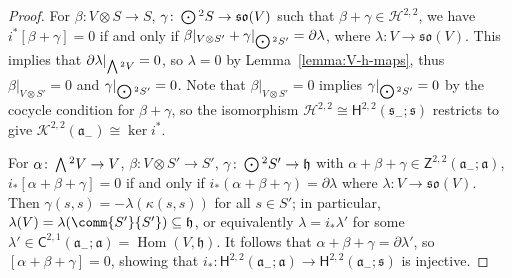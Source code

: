 \documentclass[10pt,a4paper]{amsart}
\numberwithin{equation}{section}
\newcommand{\fa}{\mathfrak{a}}
\newcommand{\fh}{\mathfrak{h}}
\newcommand{\fs}{\mathfrak{s}}
\newcommand{\fso}{\mathfrak{so}}
\newcommand{\cH}{\mathcal{H}}
\newcommand{\cK}{\mathcal{K}}
\newcommand{\ssC}{\mathsf{C}}
\newcommand{\ssH}{\mathsf{H}}
\newcommand{\ssZ}{\mathsf{Z}}
\newcommand{\Wedge}{\mathchoice{{\textstyle\bigwedge}}{\bigwedge}{\bigwedge}{\bigwedge}}	%
\newcommand{\Odot}{\mathchoice{{\textstyle\bigodot}}{\bigodot}{\bigodot}{\bigodot}}
\newcommand{\1}{\mathbbm{1}}
\DeclareMathOperator{\Hom}{Hom}
\begin{document}
\begin{proof}
	For $\beta\colon V\otimes S\to S$, $\gamma\colon \Odot^2S\to\fso(V)$ such that $\beta+\gamma\in\cH^{2,2}$, we have $i^*[\beta+\gamma]=0$ if and only if $\beta|_{V\otimes S'}+\gamma|_{\Odot^2S'}=\partial\lambda$, where $\lambda\colon V\to\fso(V)$. This implies that $\partial\lambda|_{\Wedge^2 V}=0$, so $\lambda=0$ by Lemma~\ref{lemma:V-h-maps}, thus $\beta|_{V\otimes S'}=0$ and $\gamma|_{\Odot^2S'}=0$. Note that $\beta|_{V\otimes S'}=0$ implies $\gamma|_{\Odot^2S'}=0$ by the cocycle condition for $\beta+\gamma$, so the isomorphism $\cH^{2,2}\cong\ssH^{2,2}(\fs_-;\fs)$ restricts to give $\cK^{2,2}(\fa_-)\cong \ker i^*$.
	
	For $\alpha\colon \Wedge^2V\to V$, $\beta\colon V\otimes S'\to S'$, $\gamma\colon \Odot^2S'\to\fh$ with $\alpha+\beta+\gamma\in\ssZ^{2,2}(\fa_-;\fa)$, $i_*[\alpha+\beta+\gamma]=0$ if and only if $i_*(\alpha+\beta+\gamma)=\partial\lambda$ where $\lambda:V\to\fso(V)$. Then $\gamma(s,s)=-\lambda(\kappa(s,s))$ for all $s\in S'$; in particular, $\lambda(V)=\lambda(\comm{S'}{S'})\subseteq\fh$, or equivalently $\lambda=i_*\lambda'$ for some $\lambda'\in\ssC^{2,1}(\fa_-;\fa)=\Hom(V,\fh)$. It follows that $\alpha+\beta+\gamma=\partial\lambda'$, so $[\alpha+\beta+\gamma]=0$, showing that $i_*\colon \ssH^{2,2}(\fa_-;\fa)\to \ssH^{2,2}(\fa_-;\fs)$ is injective.
\end{proof}
\end{document}
